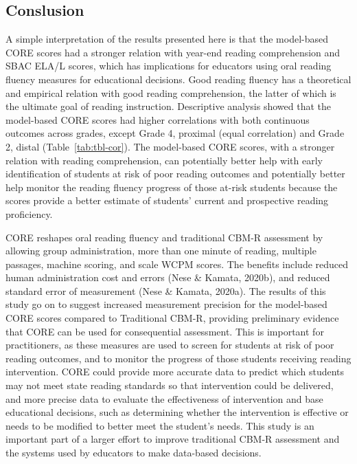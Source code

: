 \documentclass[
  english,
  man, fleqn, noextraspace]{apa6}
\begin{document}
\hypertarget{conslusion}{%
\subsection{Conslusion}\label{conslusion}}

A simple interpretation of the results presented here is that the model-based CORE scores had a stronger relation with year-end reading comprehension and SBAC ELA/L scores, which has implications for educators using oral reading fluency measures for educational decisions. Good reading fluency has a theoretical and empirical relation with good reading comprehension, the latter of which is the ultimate goal of reading instruction. Descriptive analysis showed that the model-based CORE scores had higher correlations with both continuous outcomes across grades, except Grade 4, proximal (equal correlation) and Grade 2, distal (Table~\ref{tab:tbl-cor}). The model-based CORE scores, with a stronger relation with reading comprehension, can potentially better help with early identification of students at risk of poor reading outcomes and potentially better help monitor the reading fluency progress of those at-risk students because the scores provide a better estimate of students' current and prospective reading proficiency.

CORE reshapes oral reading fluency and traditional CBM-R assessment by allowing group administration, more than one minute of reading, multiple passages, machine scoring, and scale WCPM scores. The benefits include reduced human administration cost and errors (Nese \& Kamata, 2020b), and reduced standard error of measurement (Nese \& Kamata, 2020a). The results of this study go on to suggest increased measurement precision for the model-based CORE scores compared to Traditional CBM-R, providing preliminary evidence that CORE can be used for consequential assessment. This is important for practitioners, as these measures are used to screen for students at risk of poor reading outcomes, and to monitor the progress of those students receiving reading intervention. CORE could provide more accurate data to predict which students may not meet state reading standards so that intervention could be delivered, and more precise data to evaluate the effectiveness of intervention and base educational decisions, such as determining whether the intervention is effective or needs to be modified to better meet the student's needs. This study is an important part of a larger effort to improve traditional CBM-R assessment and the systems used by educators to make data-based decisions.
\end{document}
